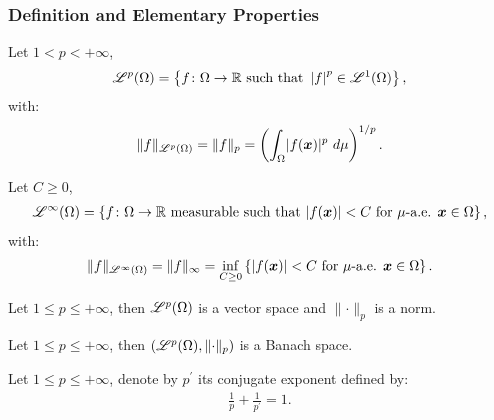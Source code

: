 \subsubsection{Definition and Elementary Properties}

\begin{definition}[$\Lp{p}(\Omega)$]
    Let $1 < p < +\infty$,
    \begin{gather}
        \mathscr{L}^{p}(\Omega) = \left\{ f \colon \Omega \rightarrow \mathbb{R} \text{ such that } \left| f \right|^p \in \mathscr{L}^{1}(\Omega) \right\},
    \end{gather}
    with:
    \begin{gather}
    \lVert f \rVert_{\mathscr{L}^{p}(\Omega)} = \lVert f \rVert_{p} = \left( \int_{\Omega} \lvert f(\bm{x}) \rvert^p ~ d \mu \right)^{1/p}.
    \end{gather}
\end{definition}

\begin{definition}[$\Lp{\infty}(\Omega)$]
    Let $C \geq 0$,
    \begin{gather}
        \mathscr{L}^{\infty}(\Omega) = \left\{ f \colon \Omega \rightarrow \mathbb{R} \text{ measurable such that } \lvert f(\bm{x}) \rvert < C \text{ for } \mu \text{-a.e. } \bm{x} \in \Omega \right\},
    \end{gather}
    with:
    \begin{gather}
    \lVert f \rVert_{\mathscr{L}^{\infty}(\Omega)} = \lVert f \rVert_{\infty} = \inf_{C \geq 0} \left\{ \lvert f(\bm{x}) \rvert < C \text{ for } \mu \text{-a.e. } \bm{x} \in \Omega \right\}.
    \end{gather}
\end{definition}

\begin{theorem}
    Let $1 \leq p \leq +\infty$, then $\Lp{p}(\Omega)$ is a vector space and $\lVert \cdot \rVert_p$ is a norm.
\end{theorem}

\begin{theorem}
    Let $1 \leq p \leq +\infty$, then $(\mathscr{L}^{p}(\Omega), \lVert \cdot \rVert_p)$ is a Banach space.
\end{theorem}

\begin{definition}
    Let $1 \leq p \leq +\infty$, denote by $p^{\prime}$ its conjugate exponent defined by:
    \begin{gather}
        \frac{1}{p} + \frac{1}{p^{\prime}} = 1.
    \end{gather}
\end{definition}


